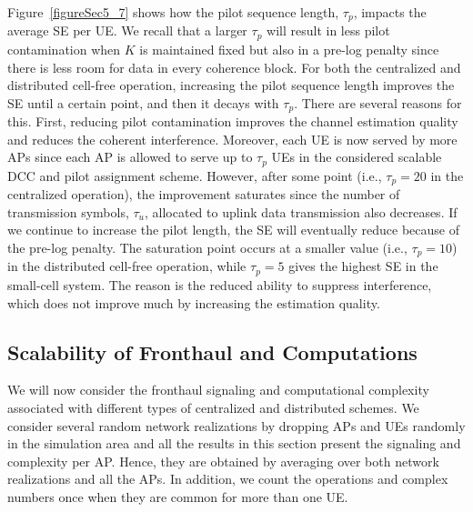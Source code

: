 Figure~\ref{figureSec5_7} shows how the pilot sequence length, $\tau_p$, impacts the average SE per UE. We recall that a larger $\tau_p$ will result in less pilot contamination when $K$ is maintained fixed but also in a pre-log penalty since there is less room for data in every coherence block. For both the centralized and distributed cell-free operation, increasing the pilot sequence length improves the SE until a certain point, and then it decays with $\tau_p$. There are several reasons for this. First, reducing pilot contamination improves the channel estimation quality and reduces the coherent interference. Moreover, each UE is now served by more APs since each AP is allowed to serve up to $\tau_p$ UEs in the considered scalable DCC and pilot assignment scheme. However, after some point (i.e., $\tau_p=20$ in the centralized operation), the improvement saturates since the number of transmission symbols, $\tau_u$, allocated to uplink data transmission also decreases. If we continue to increase the pilot length, the SE will eventually reduce because of the pre-log penalty.
The saturation point occurs at a smaller value (i.e.,  $\tau_p=10$) in the distributed cell-free operation, while $\tau_p=5$ gives the highest SE in the small-cell system. The reason is the reduced ability to suppress interference, which does not improve much by increasing the estimation quality.


\subsection{Scalability of Fronthaul and Computations}

We will now consider the fronthaul signaling and computational complexity associated with different types of centralized and distributed schemes. We consider several random network realizations by dropping APs and UEs randomly in the simulation area and all the results in this section present the signaling and complexity per AP. Hence, they are obtained by averaging over both network realizations and all the APs. In addition, we count the operations and complex numbers once when they are common for more than one UE. 


